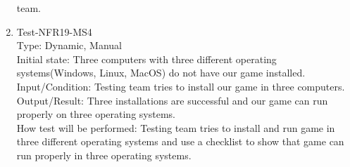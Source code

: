 \documentclass[12pt]{article}
\begin{document}
\begin{enumerate}[1.]
team.
\item Test-NFR19-MS4\\
Type: Dynamic, Manual\\
Initial state: Three computers with three 
different operating systems(Windows, Linux, MacOS) do not have our 
game installed.\\
Input/Condition: Testing team tries to install 
our game in three computers.\\
Output/Result: Three installations are successful and our game can run properly on three operating
systems.\\
How test will be performed: Testing team tries to
install and run game in three different operating
systems and use a checklist to show that game can
run properly in three operating systems.
\end{enumerate}
\newpage
\end{document}
